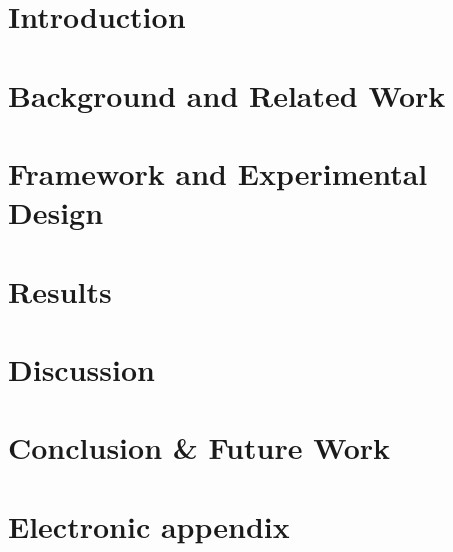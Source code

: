\documentclass[12pt]{article}
\begin{document}
\newpage
\tableofcontents


\newpage


    
\section{Introduction}
\label{intro}

\newpage

\section{Background and Related Work}
\label{related}

\newpage

\section{Framework and Experimental Design}
\label{framework-design}

\newpage

\section{Results}
\label{results}

\newpage

\section{Discussion}
\label{discussion}

\newpage

\section{Conclusion \& Future Work}
\label{conclusion}


\newpage

    



\appendix

\newpage

\section{Electronic appendix}
\label{el_app}
\end{document}
